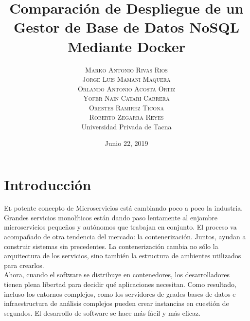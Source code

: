 \documentclass[twoside,onecolumn]{article}
\title{Comparación de Despliegue de un Gestor de Base de Datos NoSQL Mediante Docker} %
\author{%
\textsc{Marko Antonio Rivas Rios} \\[1ex] %
\textsc{Jorge Luis Mamani Maquera} \\[1.01ex] %
\textsc{Orlando Antonio Acosta Ortiz} \\[1.02ex] %
\textsc{Yofer Nain Catari Cabrera} \\[1.03ex] %
\textsc{Orestes Ramirez Ticona} \\[1.04ex] %
\textsc{Roberto Zegarra Reyes} \\[1.05ex] %
\normalsize Universidad Privada de Tacna \\  %
\normalsize {} %
}
\date{Junio 22, 2019} %
\begin{document}
\maketitle


\section{Introducción}

\lettrine[nindent=0em,lines=2]{E}l potente concepto de Microservicios está cambiando poco a poco la industria. Grandes servicios monolíticos están dando paso lentamente al enjambre microservicios pequeños y autónomos que trabajan en conjunto. El proceso va acompañado de otra tendencia del mercado: la contenerización. Juntos, ayudan a construir sistemas  sin precedentes. La contenerización cambia no sólo la arquitectura de los servicios, sino también la estructura de ambientes utilizados para crearlos.
\textbf{}\\
Ahora, cuando el software se distribuye en contenedores, los desarrolladores tienen plena libertad para decidir qué aplicaciones necesitan. Como resultado, incluso los entornos complejos, como los servidores de grades bases de datos e infraestructura de análisis complejos pueden crear instancias en cuestión de segundos. El desarrollo de software se hace más fácil y más eficaz.
\end{document}
